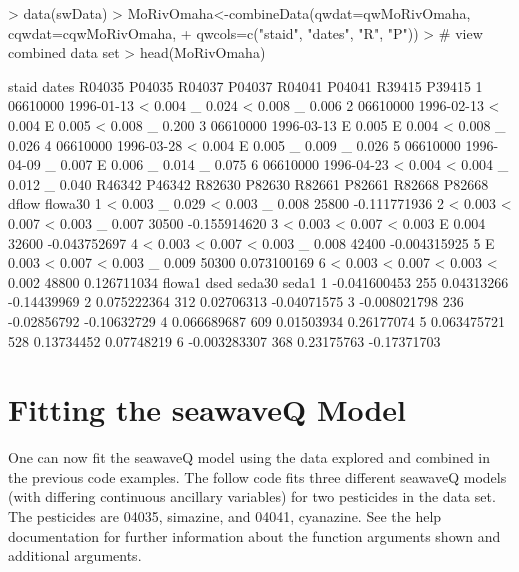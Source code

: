 \documentclass[11pt]{article}
\begin{document}
\begin{Schunk}
\begin{Sinput}
> data(swData)
> MoRivOmaha<-combineData(qwdat=qwMoRivOmaha, cqwdat=cqwMoRivOmaha,
+ qwcols=c("staid", "dates", "R", "P"))
> # view combined data set
> head(MoRivOmaha)
\end{Sinput}
\begin{Soutput}
     staid      dates R04035 P04035 R04037 P04037 R04041 P04041 R39415 P39415
1 06610000 1996-01-13      <  0.004      _  0.024      <  0.008      _  0.006
2 06610000 1996-02-13      <  0.004      E  0.005      <  0.008      _  0.200
3 06610000 1996-03-13      E  0.005      E  0.004      <  0.008      _  0.026
4 06610000 1996-03-28      <  0.004      E  0.005      _  0.009      _  0.026
5 06610000 1996-04-09      _  0.007      E  0.006      _  0.014      _  0.075
6 06610000 1996-04-23      <  0.004      <  0.004      _  0.012      _  0.040
  R46342 P46342 R82630 P82630 R82661 P82661 R82668 P82668 dflow      flowa30
1      <  0.003      _  0.029      <  0.003      _  0.008 25800 -0.111771936
2      <  0.003      <  0.007      <  0.003      _  0.007 30500 -0.155914620
3      <  0.003      <  0.007      <  0.003      E  0.004 32600 -0.043752697
4      <  0.003      <  0.007      <  0.003      _  0.008 42400 -0.004315925
5      E  0.003      <  0.007      <  0.003      _  0.009 50300  0.073100169
6      <  0.003      <  0.007      <  0.003      <  0.002 48800  0.126711034
        flowa1 dsed      seda30       seda1
1 -0.041600453  255  0.04313266 -0.14439969
2  0.075222364  312  0.02706313 -0.04071575
3 -0.008021798  236 -0.02856792 -0.10632729
4  0.066689687  609  0.01503934  0.26177074
5  0.063475721  528  0.13734452  0.07748219
6 -0.003283307  368  0.23175763 -0.17371703
\end{Soutput}
\end{Schunk}

\section{Fitting the seawaveQ Model}

One can now fit the seawaveQ model using the data explored and combined in the previous code examples.  The follow code fits three different seawaveQ models (with differing continuous ancillary variables) for two pesticides in the data set.  The pesticides are 04035, simazine, and 04041, cyanazine.  See the help documentation for further information about the function arguments shown and additional arguments.
\vspace{5 mm}
\end{document}
